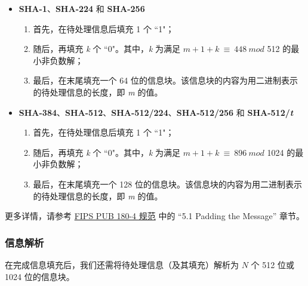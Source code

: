 \documentclass[main\_\_CN.tex]{subfiles}
\begin{document}
\begin{itemize}
    \item \textbf{SHA-1}、\textbf{SHA-224} 和 \textbf{SHA-256}
        \begin{enumerate}
        \item 首先，在待处理信息后填充 1 个 ``1"；
        \item 随后，再填充 {\it{k}} 个 ``0"。其中，{\it{k}} 为满足 \begin{math}m + 1 + k \ {\equiv} \ 448 \ mod \end{math} 512 的最小非负数解；
        \item 最后，在末尾填充一个 64 位的信息块。该信息块的内容为用二进制表示的待处理信息的长度，即 {\it{m}} 的值。
        \end{enumerate}
    \item \textbf{SHA-384}、\textbf{SHA-512}、\textbf{SHA-512/224}、\textbf{SHA-512/256} 和 \textbf{SHA-512/{\it{t}}}
        \begin{enumerate}
        \item 首先，在待处理信息后填充 1 个 ``1"；
        \item 随后，再填充 {\it{k}} 个 ``0"。其中，{\it{k}} 为满足 \begin{math}m + 1 + k \ {\equiv} \ 896 \ mod \end{math} 1024 的最小非负数解；
        \item 最后，在末尾填充一个 128 位的信息块。该信息块的内容为用二进制表示的待处理信息的长度，即 {\it{m}} 的值。
        \end{enumerate}
\end{itemize}

更多详情，请参考 \href{https://doi.org/10.6028/NIST.FIPS.180-4}{FIPS PUB 180-4 规范} 中的 “5.1 Padding the Message” 章节。

\subsubsection{信息解析}\label{sec:sha-parsing-msg}

在完成信息填充后，我们还需将待处理信息（及其填充）解析为 \begin{math}N\end{math} 个 512 位或 1024 位的信息块。
\end{document}
